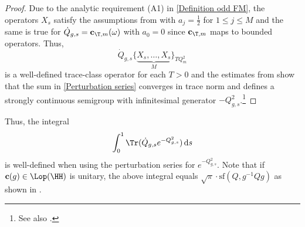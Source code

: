 \documentclass[a4paper, english, 12pt, bibliography=totocnumbered,
index=totoc]{scrartcl}
\begin{document}
\begin{proof}
	Due to the analytic requirement (A1) in \cref{Definition odd FM}, the
	operators $X_s$ satisfy
	the assumptions from \cite[Lemma 4.2]{GüneysuLudewig} with $a_j = \frac
	12$ for $1 \leq j
	\leq M$ and the same is true for $\dot{Q}_{g,s} =
	\mathbf{c}_{\T,m}(\omega)$
	with $a_0 = 0$ since $\mathbf{c}_{\T, m}$ maps to bounded operators.
	Thus,
	\begin{equation*}
		\dot{Q}_{g,s}\{\underbrace{X_s, \ldots, X_s}_{M}\}_{TQ_m^2}
	\end{equation*}
	is a well-defined trace-class operator for each $T > 0$ and the estimates
	from \cite[Lemma 4.2]{GüneysuLudewig} show that the sum in
	\cref{Perturbation series}
	converges in trace norm and defines a strongly continuous semigroup with
	infinitesimal generator $-Q_{g,s}^2$.\footnote{See also
		\cite[Chapter Nine, §2.1]{Kato}.}
\end{proof}
Thus, the integral
\begin{equation*}
	\int_0^1 \Tr(\dot{Q}_{g,s}e^{-Q_{g,s}^2}) \, \mathrm{d}s
\end{equation*}
is well-defined when using the perturbation series for $e^{-Q_{g,s}^2}$.
Note that if $\mathbf{c}(g) \in \Lop(\HH)$ is unitary, the above integral
equals $\sqrt{\pi} \cdot \mathrm{sf}(Q, g^{-1}Qg)$ as shown in
\cite[Corollary 2.7]{GetzlerOdd}.
\end{document}
